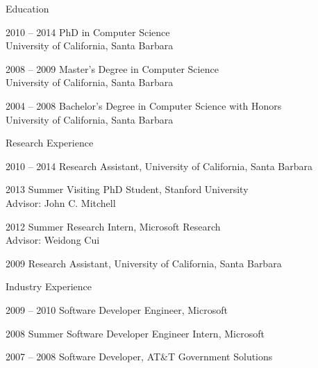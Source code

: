 \begin{vitae}
{\small

\begin{vitaesection}{Education}
\vspace{-0.1cm}
   \item [2010 -- 2014] PhD in Computer Science\\
     University of California, Santa Barbara\\
   \item [2008 -- 2009] Master's Degree in Computer Science\\
     University of California, Santa Barbara\\
   \item [2004 -- 2008] Bachelor's Degree in Computer Science with Honors\\
     University of California, Santa Barbara\\

\end{vitaesection}

\begin{vitaesection}{Research Experience}
\vspace{-0.1cm}

   \item [2010 -- 2014] Research Assistant, University of California,
     Santa Barbara

   \item [2013 Summer] Visiting PhD Student, Stanford University\\
     Advisor: John C. Mitchell

   \item [2012 Summer] Research Intern, Microsoft Research\\
     Advisor: Weidong Cui

   \item [2009] Research Assistant, University of California,
     Santa Barbara

\end{vitaesection}

\begin{vitaesection}{Industry Experience}
\vspace{-0.1cm}
   \item [2009 -- 2010] Software Developer Engineer, Microsoft

   \item [2008 Summer] Software Developer Engineer Intern, Microsoft

   \item [2007 -- 2008] Software Developer, AT\&T Government Solutions


\end{vitaesection}}
\end{vitae}

